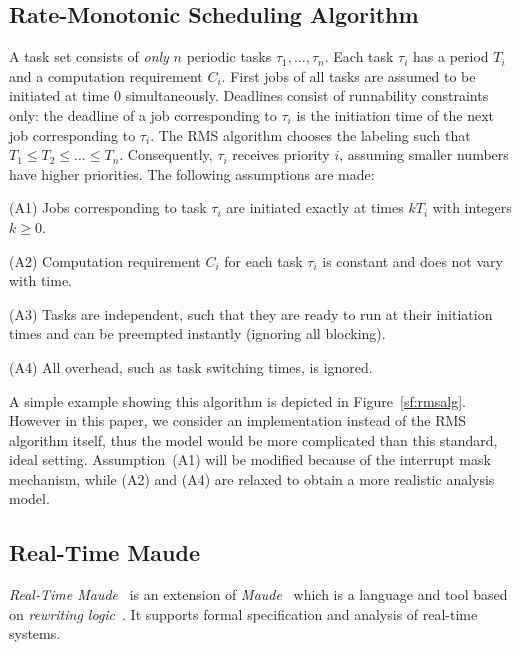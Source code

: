 \documentclass[10pt,journal]{IEEEtran}
\begin{document}
\subsection{Rate-Monotonic Scheduling Algorithm}
\label{ss:rms}
A task set consists of \emph{only} $n$ periodic tasks
$\tau_1,\ldots,\tau_n$. Each task $\tau_i$ has a period $T_i$ and a
computation requirement $C_i$. First jobs of all tasks are assumed to
be initiated at time $0$ simultaneously.  Deadlines consist of
runnability constraints only: the deadline of a job corresponding to
$\tau_i$ is the initiation time of the next job corresponding to
$\tau_i$.  The RMS algorithm chooses the labeling such that $T_1\le
T_2\le \ldots \le T_n$. Consequently, $\tau_i$ receives priority $i$,
assuming smaller numbers have higher priorities. The following
assumptions are made:

(A1) Jobs corresponding to task $\tau_i$ are initiated exactly at
times $kT_i$ with integers $k\ge 0$.

(A2) Computation requirement $C_i$ for each task $\tau_i$ is constant
and does not vary with time.

(A3) Tasks are independent, such that they are ready to run at their
initiation times and can be preempted instantly (ignoring all
blocking).

(A4) All overhead, such as task switching times, is ignored.

A simple example showing this algorithm is depicted in
Figure~\ref{sf:rmsalg}. However in this paper, we consider an
implementation instead of the RMS algorithm itself, thus the model
would be more complicated than this standard, ideal
setting. Assumption~(A1) will be modified because of the interrupt
mask mechanism, while (A2) and (A4) are relaxed to obtain a more
realistic analysis model.

\subsection{Real-Time Maude}
\emph{Real-Time Maude}~\cite{DBLP:journals/lisp/OlveczkyM07} is an
extension of \emph{Maude}~\cite{DBLP:journals/tcs/ClavelDELMMQ02}
which is a language and tool based on \emph{rewriting
  logic}~\cite{DBLP:journals/jlp/Meseguer12}.  It supports formal
specification and analysis of real-time systems.
\end{document}
